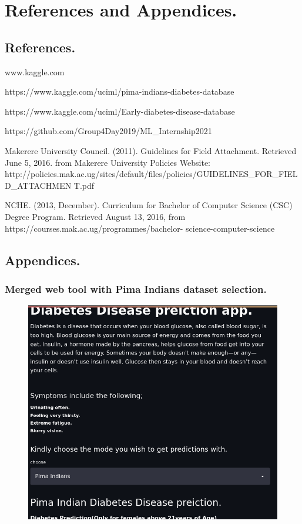 \documentclass[11pt]{article}
\begin{document}
\newpage
\section{References and Appendices.}
\subsection{References.}
\begin{thebibliography}{100}  %
	 www.kaggle.com
	
		https://www.kaggle.com/uciml/pima-indians-diabetes-database
	
		https://www.kaggle.com/uciml/Early-diabetes-disease-database
	
	 https://github.com/Group4Day2019/ML\_Internship2021
	
	 Makerere University Council. (2011). Guidelines for Field Attachment. Retrieved June 5, 2016.
	from Makerere University Policies Website:
	http://policies.mak.ac.ug/sites/default/files/policies/GUIDELINES\_FOR\_FIELD\_ATTACHMEN
	T.pdf
	
	 NCHE. (2013, December). Curriculum for Bachelor of Computer Science (CSC) Degree
	Program. Retrieved August 13, 2016, from https://courses.mak.ac.ug/programmes/bachelor-
	science-computer-science
\end{thebibliography}


\newpage
\subsection{Appendices.}
\subsubsection{Merged web tool with Pima Indians dataset selection.}
\begin{figure}[h]
	\centerline{\small 
		\includegraphics[height=0.4\textheight]  {Pmerged}}
\end{figure}
\end{document}
